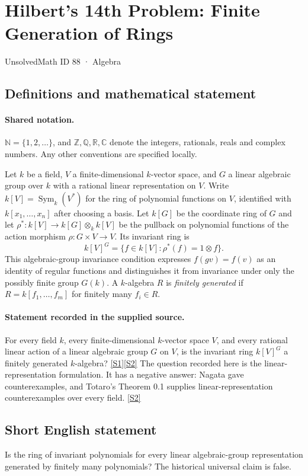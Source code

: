 \documentclass[11pt]{article}
\newcommand{\sref}[2]{\hyperlink{source:#1:#2}{[S#2]}}
\begin{document}
\setcounter{section}{87}
\section{Hilbert's 14th Problem: Finite Generation of Rings}\label{88}
{\small\sffamily UnsolvedMath ID 88 · Algebra}
\subsection{Definitions and mathematical statement}

\paragraph{Shared notation.}$\mathbb N=\{1,2,\ldots\}$, and $\mathbb Z,\mathbb Q,\mathbb R,\mathbb C$ denote the integers, rationals, reals and complex numbers. Any other conventions are specified locally.


Let $k$ be a field, $V$ a finite-dimensional $k$-vector space, and $G$ a linear algebraic group over $k$ with a rational linear representation on $V$. Write $k[V]=\operatorname{Sym}_k(V^*)$ for the ring of polynomial functions on $V$, identified with $k[x_1,\ldots,x_n]$ after choosing a basis. Let $k[G]$ be the coordinate ring of $G$ and let $\rho^*:k[V]\to k[G]\otimes_k k[V]$ be the pullback on polynomial functions of the action morphism $\rho:G\times V\to V$. Its invariant ring is
\[
k[V]^G=\{f\in k[V]:\rho^*(f)=1\otimes f\}.
\]
This algebraic-group invariance condition expresses $f(gv)=f(v)$ as an identity of regular functions and distinguishes it from invariance under only the possibly finite group $G(k)$. A $k$-algebra $R$ is \emph{finitely generated} if $R=k[f_1,\ldots,f_m]$ for finitely many $f_i\in R$.
\paragraph{Statement recorded in the supplied source.}
For every field $k$, every finite-dimensional $k$-vector space $V$, and every rational linear action of a linear algebraic group $G$ on $V$, is the invariant ring $k[V]^G$ a finitely generated $k$-algebra? \sref{88}{1}\sref{88}{2}
The question recorded here is the linear-representation formulation. It has a negative answer: Nagata gave counterexamples, and Totaro's Theorem 0.1 supplies linear-representation counterexamples over every field. \sref{88}{2}
\subsection{Short English statement}
Is the ring of invariant polynomials for every linear algebraic-group representation generated by finitely many polynomials? The historical universal claim is false.
\end{document}
